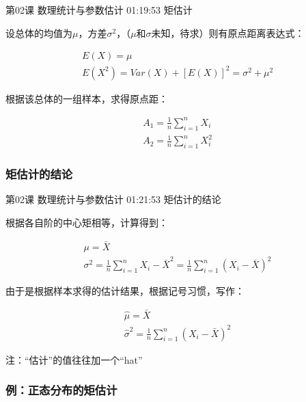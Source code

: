 \documentclass[UTF8]{ctexbook}
\begin{document}
第02课 数理统计与参数估计 01:19:53 矩估计

设总体的均值为$\mu$，方差$\sigma^{2}$，（$\mu$和$\sigma$未知，待求）则有原点距离表达式：

\begin{equation}
\begin{aligned}
E(X)=\mu \\
E(X^{2})=Var(X)+[E(X)]^{2}=\sigma^{2}+\mu^{2}
\end{aligned}
\end{equation}

根据该总体的一组样本，求得原点距：

\begin{equation}
\begin{aligned}
A_{1}=\frac{1}{n} \sum_{i=1}^{n}X_{i}\\
A_{2}=\frac{1}{n} \sum_{i=1}^{n}X_{i}^{2}
\end{aligned}
\end{equation}

\subsubsection{矩估计的结论}

第02课 数理统计与参数估计 01:21:53 矩估计的结论

根据各自阶的中心矩相等，计算得到：

\begin{equation}
\begin{aligned}
\mu=\bar{X} \\
\sigma^{2}=\frac{1}{n}\sum_{i=1}^{n}{X_{i}-\bar{X}^{2}}=\frac{1}{n}\sum_{i=1}^{n}(X_{i}-\bar{X})^{2}
\end{aligned}
\end{equation}

由于是根据样本求得的估计结果，根据记号习惯，写作：

\begin{equation}
\begin{aligned}
\hat{\mu}=\bar{X} \\
\hat{\sigma}^{2}=\frac{1}{n}\sum_{i=1}^{n}(X_{i}-\bar{X})^{2}
\end{aligned}
\end{equation}

注：“估计”的值往往加一个“hat”

\subsubsection{例：正态分布的矩估计}
\end{document}
